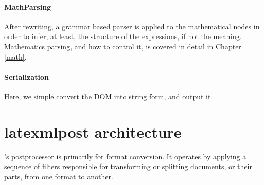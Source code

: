 \documentclass{book}
\begin{document}
\paragraph{MathParsing}\label{architecture.latexml.mathparsing}
%
After rewriting, a grammar based parser is applied to the mathematical
nodes in order to infer, at least, the structure of the expressions,
if not the meaning.
Mathematics parsing, and how to control it, is covered in detail in Chapter \ref{math}.

\paragraph{Serialization}\label{architecture.latexml.serialization}
Here, we simple convert the DOM into string form, and output it.

\section{latexmlpost architecture}\label{architecture.latexmlpost}
%
\LaTeXML's postprocessor is primarily for format conversion.
It operates by applying a sequence of filters responsible for
transforming or splitting documents, or their parts, from one format to another.
\end{document}
